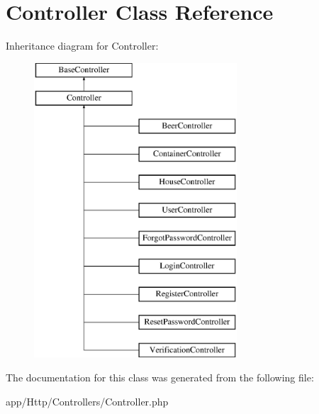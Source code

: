 \hypertarget{class_app_1_1_http_1_1_controllers_1_1_controller}{}\section{Controller Class Reference}
\label{class_app_1_1_http_1_1_controllers_1_1_controller}
Inheritance diagram for Controller\+:\begin{figure}[H]
\begin{center}
\leavevmode
\includegraphics[height=11.000000cm]{class_app_1_1_http_1_1_controllers_1_1_controller}
\end{center}
\end{figure}


The documentation for this class was generated from the following file\+:\begin{DoxyCompactItemize}
\item 
app/\+Http/\+Controllers/Controller.\+php\end{DoxyCompactItemize}
